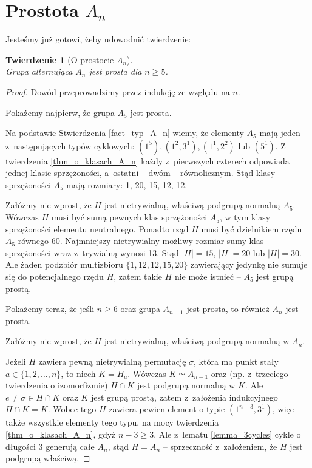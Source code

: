 \documentclass[licencjacka]{pracamgr}
\newtheorem{thh}{Twierdzenie}[section]
\begin{document}
\section{Prostota $A_n$}
Jesteśmy już gotowi, żeby udowodnić twierdzenie:

\begin{thh}[O prostocie $A_n$]\label{An_simplicity} $ $ \\
    Grupa alternująca $A_n$ jest prosta dla $n \ge 5$.
\end{thh}
\begin{proof}
    Dowód przeprowadzimy przez indukcję ze względu na $n$.

    Pokażemy najpierw, że grupa $A_5$ jest prosta.

    Na podstawie Stwierdzenia \ref{fact_typ_A_n} wiemy, że elementy $A_5$ mają jeden z~następujących typów cyklowych:
    $(1^5), (1^2, 3^1), (1^1, 2^2)$ lub $(5^1)$.
    Z twierdzenia \ref{thm_o_klasach_A_n} każdy z~pierwszych czterech odpowiada jednej klasie sprzężoności, a~ostatni -- dwóm -- równolicznym.
    Stąd klasy sprzężoności $A_5$ mają rozmiary: 1, 20, 15, 12, 12.

    Załóżmy nie wprost, że $H$ jest nietrywialną, właściwą podgrupą normalną $A_5$.
    Wówczas $H$ musi być sumą pewnych klas sprzężoności $A_5$, w tym klasy sprzężoności elementu neutralnego.
    Ponadto rząd $H$ musi być dzielnikiem rzędu $A_5$ równego 60.
    Najmniejszy nietrywialny możliwy rozmiar sumy klas sprzężoności wraz z~trywialną wynosi 13.
    Stąd $|H| = 15$, $|H| = 20$ lub $|H| = 30$.
    Ale żaden podzbiór multizbioru $\{1, 12, 12, 15, 20 \}$ zawierający jedynkę nie sumuje się do potencjalnego rzędu $H$,
    zatem takie $H$ nie może istnieć -- $A_5$ jest grupą prostą.

    Pokażemy teraz, że jeśli $n \ge 6$ oraz grupa $A_{n-1}$ jest prosta, to również $A_n$ jest prosta.

    Załóżmy nie wprost, że $H$ jest nietrywialną, właściwą podgrupą normalną w $A_n$.

    Jeżeli $H$ zawiera pewną nietrywialną permutację $\sigma$, która ma punkt stały $a \in \{ 1, 2, \ldots, n \}$, to niech $K = H_a$.
    Wówczas $K \simeq A_{n-1}$ oraz (np. z~trzeciego twierdzenia o izomorfizmie) $H \cap K$ jest podgrupą normalną w $K$.
    Ale $e \ne \sigma \in H \cap K$ oraz $K$ jest grupą prostą, zatem z~założenia indukcyjnego $H \cap K = K$.
    Wobec tego $H$ zawiera pewien element o typie $(1^{n-3}, 3^1)$, więc także wszystkie elementy
    tego typu, na mocy twierdzenia \ref{thm_o_klasach_A_n}, gdyż $n-3 \ge 3$.
    Ale z~lematu \ref{lemma_3cycles}    cykle o długości 3 generują całe $A_n$, stąd $H = A_n$ --
    sprzeczność z~założeniem, że $H$ jest podgrupą właściwą.


\end{proof}
\end{document}
